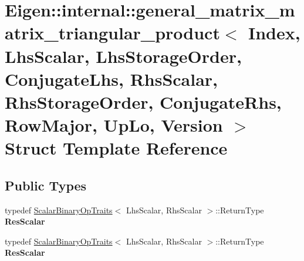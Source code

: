 \hypertarget{struct_eigen_1_1internal_1_1general__matrix__matrix__triangular__product_3_01_index_00_01_lhs_scd4c70a4453dce53548fa7c3d3f42cf39}{}\section{Eigen\+:\+:internal\+:\+:general\+\_\+matrix\+\_\+matrix\+\_\+triangular\+\_\+product$<$ Index, Lhs\+Scalar, Lhs\+Storage\+Order, Conjugate\+Lhs, Rhs\+Scalar, Rhs\+Storage\+Order, Conjugate\+Rhs, Row\+Major, Up\+Lo, Version $>$ Struct Template Reference}
\label{struct_eigen_1_1internal_1_1general__matrix__matrix__triangular__product_3_01_index_00_01_lhs_scd4c70a4453dce53548fa7c3d3f42cf39}
\subsection*{Public Types}
\begin{DoxyCompactItemize}
\item 
\mbox{\label{struct_eigen_1_1internal_1_1general__matrix__matrix__triangular__product_3_01_index_00_01_lhs_scd4c70a4453dce53548fa7c3d3f42cf39_adbc87d60ab316ca17ebc55ab8f3d3b0c}} 
typedef \hyperlink{group___core___module_struct_eigen_1_1_scalar_binary_op_traits}{Scalar\+Binary\+Op\+Traits}$<$ Lhs\+Scalar, Rhs\+Scalar $>$\+::Return\+Type {\bfseries Res\+Scalar}
\item 
\mbox{\label{struct_eigen_1_1internal_1_1general__matrix__matrix__triangular__product_3_01_index_00_01_lhs_scd4c70a4453dce53548fa7c3d3f42cf39_adbc87d60ab316ca17ebc55ab8f3d3b0c}} 
typedef \hyperlink{group___core___module_struct_eigen_1_1_scalar_binary_op_traits}{Scalar\+Binary\+Op\+Traits}$<$ Lhs\+Scalar, Rhs\+Scalar $>$\+::Return\+Type {\bfseries Res\+Scalar}
\end{DoxyCompactItemize}
